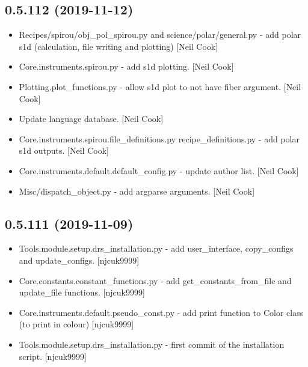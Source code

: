 \documentclass[a4paper,10pt,english]{report}
\begin{document}
\subsection{0.5.112 (2019-11-12)}
\label{\detokenize{misc/changelog:id29}}\begin{itemize}
\item {} 
Recipes/spirou/obj\_pol\_spirou.py and science/polar/general.py - add
polar s1d (calculation, file writing and plotting) {[}Neil Cook{]}

\item {} 
Core.instruments.spirou.py - add s1d plotting. {[}Neil Cook{]}

\item {} 
Plotting.plot\_functions.py - allow s1d plot to not have fiber
argument. {[}Neil Cook{]}

\item {} 
Update language database. {[}Neil Cook{]}

\item {} 
Core.instruments.spirou.file\_definitions.py recipe\_definitions.py -
add polar s1d outputs. {[}Neil Cook{]}

\item {} 
Core.instruments.default.default\_config.py - update author list. {[}Neil
Cook{]}

\item {} 
Misc/dispatch\_object.py - add argparse arguments. {[}Neil Cook{]}

\end{itemize}


\subsection{0.5.111 (2019-11-09)}
\label{\detokenize{misc/changelog:id30}}\begin{itemize}
\item {} 
Tools.module.setup.drs\_installation.py - add user\_interface,
copy\_configs and update\_configs. {[}njcuk9999{]}

\item {} 
Core.constants.constant\_functions.py - add get\_constants\_from\_file and
update\_file functions. {[}njcuk9999{]}

\item {} 
Core.instruments.default.pseudo\_const.py - add print function to Color
class (to print in colour) {[}njcuk9999{]}

\item {} 
Tools.module.setup.drs\_installation.py - first commit of the
installation script. {[}njcuk9999{]}

\end{itemize}
\end{document}
